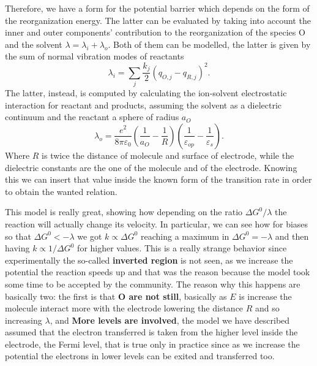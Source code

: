 {\begin{figure}[t]
{        }
    \end{figure}
    Therefore, we have a form for the potential barrier which depends on the form of the reorganization energy. The latter can be evaluated by taking into account the inner and outer components' contribution to the reorganization of the species O and the solvent $\lambda = \lambda_i + \lambda_o$. Both of them can be modelled, the latter is given by the sum of normal vibration modes of reactants
    \begin{equation}
        \lambda_i = \sum_j \frac{k_j}{2}(q_{O,j} - q_{R,j})^2.
    \end{equation}
    The latter, instead, is computed by calculating the ion-solvent electrostatic interaction for reactant and products, assuming the solvent as a dielectric continuum and the reactant a sphere of radius $a_O$
    \begin{equation}
        \lambda_o = \frac{e^2}{8\pi\varepsilon_0} \left( \frac{1}{a_O} - \frac{1}{R} \right)\left( \frac{1}{\varepsilon_{op}} - \frac{1}{\varepsilon_s} \right).
    \end{equation}
    Where $R$ is twice the distance of molecule and surface of electrode, while the dielectric constants are the one of the molecule and of the electrode. Knowing this we can insert that value inside the known form of the transition rate in order to obtain the wanted relation.
}
\noindent
This model is really great, showing how depending on the ratio $\Delta G^0/\lambda$ the reaction will actually change its velocity. In particular, we can see how for biases so that $\Delta G^0 < -\lambda$ we got $k \propto \Delta G^0$ reaching a maximum in $\Delta G^0 = -\lambda$ and then having $k \propto 1/\Delta G^0$ for higher values. This is a really strange behavior since experimentally the so-called \textbf{inverted region} is not seen, as we increase the potential the reaction speeds up and that was the reason because the model took some time to be accepted by the community. The reason why this happens are basically two: the first is that \textbf{O are not still}, basically as $E$ is increase the molecule interact more with the electrode lowering the distance $R$ and so increasing $\lambda$, and \textbf{More levels are involved}, the model we have described assumed that the electron transferred is taken from the higher level inside the electrode, the Fermi level, that is true only in practice since as we increase the potential the electrons in lower levels can be exited and transferred too. 
